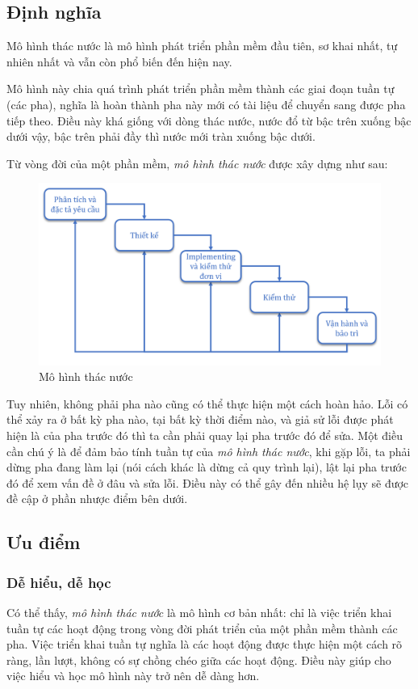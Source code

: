 \documentclass[14pt]{extarticle}
\begin{document}
\subsection{Định nghĩa}
Mô hình thác nước là mô hình phát triển phần mềm đầu tiên,
sơ khai nhất, tự nhiên nhất và vẫn còn phổ biến đến hiện nay.

Mô hình này chia quá trình phát triển phần mềm thành các giai đoạn
tuần tự (các pha), nghĩa là hoàn thành pha này mới có tài liệu để
chuyển sang được pha tiếp theo.
Điều này khá giống với dòng thác nước, nước đổ từ bậc trên
xuống bậc dưới vậy, bậc trên phải đầy thì nước mới tràn xuống bậc dưới.

Từ vòng đời của một phần mềm, \textit{mô hình thác nước} được xây dựng như sau:
\begin{figure}[h]
  \centering
  \includegraphics[width=\textwidth]{waterfall2.png}
  \caption{Mô hình thác nước}
  \label{fig:waterfall}
\end{figure}

Tuy nhiên, không phải pha nào cũng có thể thực hiện một cách hoàn hảo.
Lỗi có thể xảy ra ở bất kỳ pha nào, tại bất kỳ thời điểm nào, và giả
sử lỗi được phát hiện là của pha trước đó thì ta cần phải quay lại pha
trước đó để sửa. Một điều cần chú ý là để đảm bảo tính tuần tự của
\textit{mô hình thác nước}, khi gặp lỗi, ta phải dừng pha đang làm lại (nói
cách khác là dừng cả quy trình lại), lật lại pha trước đó để xem
vấn đề ở đâu và sửa lỗi. Điều này có thể gây đến nhiều hệ lụy sẽ được
đề cập ở phần nhược điểm bên dưới.

\subsection{Ưu điểm}

\subsubsection*{Dễ hiểu, dễ học}
Có thể thấy, \textit{mô hình thác nước} là mô hình cơ bản nhất: chỉ là việc
triển khai tuần tự các hoạt động trong vòng đời phát triển của một phần mềm thành
các pha.
Việc triển khai tuần tự nghĩa là các hoạt động được thực hiện một cách rõ ràng,
lần lượt, không có sự chồng chéo giữa các hoạt động. Điều này giúp cho việc
hiểu và học mô hình này trở nên dễ dàng hơn.
\end{document}
